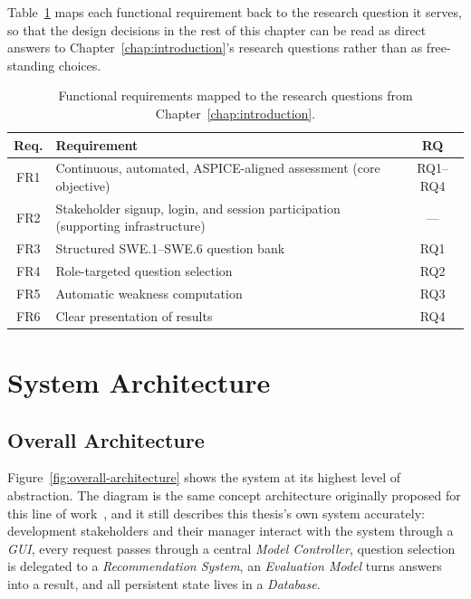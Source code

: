 \documentclass[a4paper, 12pt, oneside, openany, BCOR1cm,toc=chapterentrywithdots]{scrbook}
\begin{document}
Table~\ref{tab:fr-traceability} maps each functional requirement back to the research question
it serves, so that the design decisions in the rest of this chapter can be read as direct answers
to Chapter~\ref{chap:introduction}'s research questions rather than as free-standing choices.

\begin{table}[h]
\centering
\caption{Functional requirements mapped to the research questions from
Chapter~\ref{chap:introduction}.}
\label{tab:fr-traceability}
\begin{tabular}{|c|p{9.5cm}|c|}
\hline
\textbf{Req.} & \textbf{Requirement} & \textbf{RQ} \\
\hline
FR1 & Continuous, automated, ASPICE-aligned assessment (core objective) & RQ1--RQ4 \\
\hline
FR2 & Stakeholder signup, login, and session participation (supporting infrastructure) & --- \\
\hline
FR3 & Structured SWE.1--SWE.6 question bank & RQ1 \\
\hline
FR4 & Role-targeted question selection & RQ2 \\
\hline
FR5 & Automatic weakness computation & RQ3 \\
\hline
FR6 & Clear presentation of results & RQ4 \\
\hline
\end{tabular}
\end{table}


\section{System Architecture}

\subsection{Overall Architecture}

Figure~\ref{fig:overall-architecture} shows the system at its highest level of abstraction. The
diagram is the same concept architecture originally proposed for this line of
work~\cite{datsogiannis2024early}, and it still describes this thesis's own system accurately:
development stakeholders and their manager interact with the system through a \emph{GUI}, every
request passes through a central \emph{Model Controller}, question selection is delegated to a
\emph{Recommendation System}, an \emph{Evaluation Model} turns answers into a result, and all
persistent state lives in a \emph{Database}.
\end{document}
